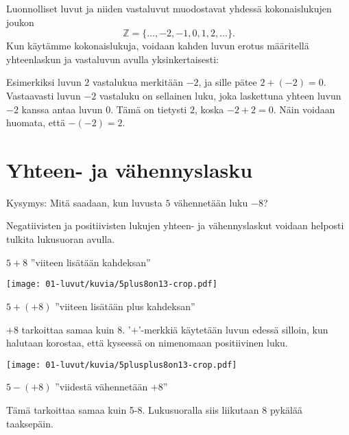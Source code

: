 
Luonnolliset luvut ja niiden vastaluvut muodostavat yhdessä
kokonaislukujen joukon
\[\mathbb{Z} = \{\ldots, -2, -1, 0, 1, 2, \ldots\}.\]
Kun käytämme kokonaislukuja, voidaan kahden luvun erotus määritellä
yhteenlaskun ja vastaluvun avulla yksinkertaisesti:

\laatikko{
\[m-n = m+(-n)\]
}

    Esimerkiksi luvun $2$ vastalukua merkitään $-2$, ja sille pätee $2+(-2)=0$. Vastaavasti luvun $-2$ vastaluku on sellainen luku, joka laskettuna yhteen luvun $-2$ kanssa antaa luvun $0$. Tämä on tietysti $2$, koska $-2+2=0$. Näin voidaan huomata, että $-(-2)=2$.
    


\section{Yhteen- ja vähennyslasku}

    Kysymys: Mitä saadaan, kun luvusta $5$ vähennetään luku $-8$?
    
    Negatiivisten ja positiivisten lukujen yhteen- ja vähennyslaskut voidaan helposti tulkita lukusuoran avulla.
    
    
    $5+8$ ''viiteen lisätään kahdeksan''
    \begin{center}
    \texttt{[image: 01-luvut/kuvia/5plus8on13-crop.pdf]}
    \end{center}
    
    $5+(+8)$ ''viiteen lisätään plus kahdeksan''
    
    $+8$ tarkoittaa samaa kuin $8$. '$+$'-merkkiä käytetään luvun edessä silloin, kun halutaan korostaa, että kyseessä on nimenomaan positiivinen luku.
    
\vspace{0.3cm}     
    
    \begin{center}
    \texttt{[image: 01-luvut/kuvia/5plusplus8on13-crop.pdf]}
    \end{center}
    
    $5-(+8)$ ''viidestä vähennetään $+8$''
    
    Tämä tarkoittaa samaa kuin 5-8. Lukusuoralla siis liikutaan 8 pykälää taaksepäin.

